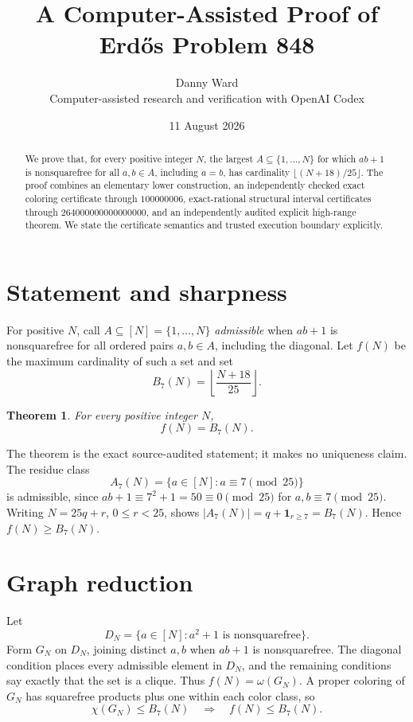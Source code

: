 \documentclass[11pt]{article}
\title{A Computer-Assisted Proof of Erd\H{o}s Problem 848}
\author{Danny Ward\\
\small Computer-assisted research and verification with OpenAI Codex}
\date{11 August 2026}
\newtheorem{theorem}{Theorem}
\newcommand{\Bseven}{B_7}
\begin{document}
\maketitle

\begin{abstract}
We prove that, for every positive integer $N$, the largest
$A\subseteq\{1,\ldots,N\}$ for which $ab+1$ is nonsquarefree for all
$a,b\in A$, including $a=b$, has cardinality
$\lfloor(N+18)/25\rfloor$.  The proof combines an elementary lower
construction, an independently checked exact coloring certificate through
$100000006$, exact-rational structural interval certificates through
$264000000000000000$, and an independently audited explicit high-range
theorem.  We state the certificate semantics and trusted execution boundary
explicitly.
\end{abstract}

\section{Statement and sharpness}

For positive $N$, call $A\subseteq[N]=\{1,\ldots,N\}$ \emph{admissible}
when $ab+1$ is nonsquarefree for all ordered pairs $a,b\in A$, including
the diagonal.  Let $f(N)$ be the maximum cardinality of such a set and set
\[
  \Bseven(N)=\left\lfloor\frac{N+18}{25}\right\rfloor.
\]

\begin{theorem}
For every positive integer $N$,
\[
  f(N)=\Bseven(N).
\]
\end{theorem}

The theorem is the exact source-audited statement; it makes no uniqueness
claim.  The residue class
\[
  A_7(N)=\{a\in[N]:a\equiv7\pmod{25}\}
\]
is admissible, since
$ab+1\equiv7^2+1=50\equiv0\pmod{25}$ for
$a,b\equiv7\pmod{25}$.  Writing
$N=25q+r$, $0\le r<25$, shows
$|A_7(N)|=q+\mathbf1_{r\ge7}=\Bseven(N)$.  Hence
$f(N)\ge\Bseven(N)$.

\section{Graph reduction}

Let
\[
 D_N=\{a\in[N]:a^2+1\text{ is nonsquarefree}\}.
\]
Form $G_N$ on $D_N$, joining distinct $a,b$ when $ab+1$ is
nonsquarefree.  The diagonal condition places every admissible element in
$D_N$, and the remaining conditions say exactly that the set is a clique.
Thus $f(N)=\omega(G_N)$.  A proper coloring of $G_N$ has squarefree
products plus one within each color class, so
\[
 \chi(G_N)\le\Bseven(N)\quad\Longrightarrow\quad
 f(N)\le\Bseven(N).
\]
\end{document}
